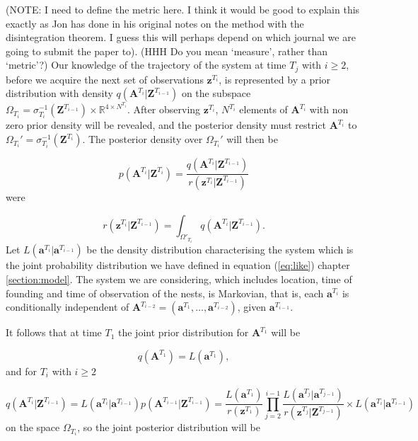 \documentclass{article}
\renewcommand{\vec}[1]{\mathbf{#1}}
\begin{document}
(NOTE: I need to define the metric here. I think it would be good to explain this exactly as Jon has done in his original notes on the method with the disintegration theorem. I guess this will perhaps depend on which journal we are going to submit the paper to). (HHH Do you mean `measure', rather than `metric'?)
Our knowledge of the trajectory of the system at time $T_j$ with $i \geq 2$, before we acquire the next set of observations $\vec{z}^{T_i}$, is represented by a prior distribution with density $q(\vec{A}^{T_i} | \vec{Z}^{T_{i-1}})$ on the subspace $\Omega_{T_i} = \sigma_{T_i}^{-1} (\vec{Z}^{T_{i-1}}) \times \mathbb{R}^{4 \times N^{T_i}}$. After observing $\vec{z}^{T_i}$, $N^{T_i}$ elements of $\vec{A}^{T_i}$ with non zero prior density will be revealed, and the posterior density must restrict $\vec{A}^{T_i}$ to $\Omega_{T_i}' = \sigma_{T_i}^{-1}(\vec{Z}^{T_i})$. The posterior density over $\Omega_{T_i}'$ will then be

\begin{equation*}
    p(\vec{A}^{T_i} | \vec{Z}^{T_i}) = \frac{q(\vec{A}^{T_i} | \vec{Z}^{T_{i-1}})}{r(\vec{z}^{T_i} | \vec{Z}^{T_{i-1}})}
\end{equation*}
were

\begin{equation*}
    r(\vec{z}^{T_i} | \vec{Z}^{T_{i-1}}) = \int_{\Omega'_{T_i}} q(\vec{A}^{T_i} | \vec{Z}^{T_{i-1}}).
\end{equation*}
Let $L(\vec{a}^{T_i} | \vec{a}^{T_{i-1}})$ be the density distribution characterising the system which is the joint probability distribution we have defined in equation (\ref{eq:like}) chapter  \ref{section:model}. The system we are considering, which includes location, time of founding and time of observation of the nests, is Markovian, that is, each $\vec{a}^{T_i}$ is conditionally independent of $\vec{A}^{T_{i-2}} = (\vec{a}^{T_1}, \ldots,\vec{a}^{T_{i-2}})$, given $\vec{a}^{T_{i-1}}$.

It follows that at time $T_1$ the joint prior distribution for $\vec{A}^{T_1}$ will be

\begin{equation*}
    q(\vec{A}^{T_1}) = L(\vec{a}^{T_1}),
\end{equation*}
and for $T_i$ with $i \geq 2$

\begin{equation*}
    q(\vec{A}^{T_i} | \vec{Z}^{T_{i-1}}) = L(\vec{a}^{T_i} | \vec{a}^{T_{i-1}}) p(\vec{A}^{T_{i-1}} | \vec{Z}^{T_{i-1}}) = \frac{L(\vec{a}^{T_1})}{r(\vec{z}^{T_1})} \prod_{j=2}^{i-1} \frac{L(\vec{a}^{T_j} | \vec{a}^{T_{j-1}})}{r(\vec{z}^{T_j} | \vec{Z}^{T_{j-1}})} \times L(\vec{a}^{T_i} | \vec{a}^{T_{i-1}})
\end{equation*}
on the space $\Omega_{T_i}$, so the joint posterior distribution will be
\end{document}
